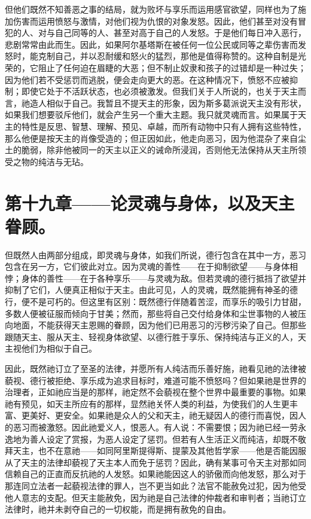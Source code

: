 但他们既然不知善恶之事的结局，就为败坏与享乐而运用感官欲望，同样也为了施加伤害而运用愤怒与激情，对他们视为仇恨的对象发怒。因此，他们甚至对没有冒犯的人、对与自己同等的人、甚至对高于自己的人发怒。于是他们每日冲入恶行，悲剧常常由此而生。因此，如果阿尔基塔斯在被任何一位公民或同等之辈伤害而发怒时，能克制自己，并以忍耐缓和怒火的猛烈，那他是值得称赞的。这种自制是光荣的，它阻止了任何迫在眉睫的大恶；但不制止奴隶和孩子的过错却是一种过失；因为他们若不受惩罚而逃脱，便会走向更大的恶。在这种情况下，愤怒不应被抑制；即使它处于不活跃状态，也必须被激发。但我们关于人所说的，也关于天主而言，祂造人相似于自己。我暂且不提天主的形象，因为斯多葛派说天主没有形状，如果我们想要驳斥他们，就会产生另一个重大主题。我只就灵魂而言。如果属于天主的特性是反思、智慧、理解、预见、卓越，而所有动物中只有人拥有这些特性，那么他便是按天主的肖像受造的；但正因如此，他走向恶习，因为他混杂了来自尘土的脆弱，除非他被同一的天主以正义的诫命所浸润，否则他无法保持从天主所领受之物的纯洁与无玷。\par


\section{第十九章——论灵魂与身体，以及天主眷顾。}

但既然人由两部分组成，即灵魂与身体，如我们所说，德行包含在其中一方，恶习包含在另一方，它们彼此对立。因为灵魂的善性——在于抑制欲望——与身体相悖；身体的善性——在于各种享乐——与灵魂为敌。但若灵魂的德行抵挡了欲望并抑制了它们，人便真正相似于天主。由此可见，人的灵魂，既然能拥有神圣的德行，便不是可朽的。但这里有区别：既然德行伴随着苦涩，而享乐的吸引力甘甜，多数人便被征服而倾向于甘美；然而，那些将自己交付给身体和尘世事物的人被压向地面，不能获得天主恩赐的眷顾，因为他们已用恶习的污秽污染了自己。但那些跟随天主、服从天主、轻视身体欲望、以德行胜于享乐、保持纯洁与正义的人，天主视他们为相似于自己。\par

因此，既然祂订立了至圣的法律，并愿所有人纯洁而乐善好施，祂看见祂的法律被藐视、德行被拒绝、享乐成为追求目标时，难道可能不愤怒吗？但如果祂是世界的治理者，正如祂应当是的那样，祂定然不会藐视在整个世界中最重要的事物。如果祂有预见，如天主所应有的那样，显然祂关怀人类的利益，为使我们的人生更丰富、更美好、更安全。如果祂是众人的父和天主，祂无疑因人的德行而喜悦，因人的恶习而被激怒。因此祂爱义人，恨恶人。有人说：不需要恨；因为祂已经一劳永逸地为善人设定了赏报，为恶人设定了惩罚。但若有人生活正义而纯洁，却既不敬拜天主，也不在意祂——如同阿里斯提得斯、提蒙及其他哲学家——他是否能因服从了天主的法律却藐视了天主本人而免于惩罚？因此，确有某事可令天主对那如同信赖自己的正直而反抗祂的人发怒。如果祂能因这人的骄傲而向他发怒，那么对于那连同立法者一起藐视法律的罪人，岂不更当如此？法官不能赦免过犯，因为他受他人意志的支配。但天主能赦免，因为祂是自己法律的仲裁者和审判者；当祂订立法律时，祂并未剥夺自己的一切权能，而是拥有赦免的自由。\par


